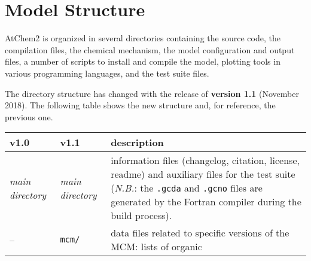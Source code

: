 \section{Model Structure} \label{sec:structure}

AtChem2 is organized in several directories containing the source code,
the compilation files, the chemical mechanism, the model configuration
and output files, a number of scripts to install and compile the model,
plotting tools in various programming languages, and the test suite
files.

The directory structure has changed with the release of \textbf{version
1.1} (November 2018). The following table shows the new structure and,
for reference, the previous one.

\begin{longtable}[]{@{}lll@{}}
\begin{minipage}[b]{0.20\columnwidth}\raggedright
v1.0\strut
\end{minipage} & \begin{minipage}[b]{0.24\columnwidth}\raggedright
v1.1\strut
\end{minipage} & \begin{minipage}[b]{0.48\columnwidth}\raggedright
description\strut
\end{minipage}\tabularnewline
\endhead
\begin{minipage}[t]{0.20\columnwidth}\raggedright
\emph{main directory}\strut
\end{minipage} & \begin{minipage}[t]{0.24\columnwidth}\raggedright
\emph{main directory}\strut
\end{minipage} & \begin{minipage}[t]{0.48\columnwidth}\raggedright
information files (changelog, citation, license, readme) and auxiliary
files for the test suite (\emph{N.B.}: the \texttt{.gcda} and
\texttt{.gcno} files are generated by the Fortran compiler during the
build process).\strut
\end{minipage}\tabularnewline
\begin{minipage}[t]{0.20\columnwidth}\raggedright
--\strut
\end{minipage} & \begin{minipage}[t]{0.24\columnwidth}\raggedright
\texttt{mcm/}\strut
\end{minipage} & \begin{minipage}[t]{0.48\columnwidth}\raggedright
data files related to specific versions of the MCM: lists of organic

\end{minipage}
\end{longtable}
